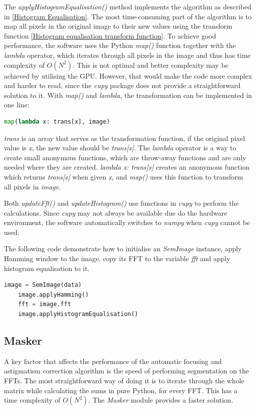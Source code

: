 \documentclass[conference]{IEEEtran}
\begin{document}
The \textit{applyHistogramEqualisation()} method implements the algorithm as described in \ref{Histogram Equalisation}. The most time-consuming part of the algorithm is to map all pixels in the original image to their new values using the transform function \eqref{Histogram equalisation transform function}. To achieve good performance, the software uses the Python \textit{map()} function together with the \textit{lambda} operator, which iterates through all pixels in the image and thus has time complexity of $O(N^2)$. This is not optimal and better complexity may be achieved by utilising the GPU. However, that would make the code more complex and harder to read, since the \textit{cupy} package does not provide a straightforward solution to it. With \textit{map()} and \textit{lambda}, the transformation can be implemented in one line:
\begin{lstlisting}[language=Python]
    map(lambda x: trans[x], image)
\end{lstlisting}
\textit{trans} is an array that serves as the transformation function, if the original pixel value is \textit{x}, the new value should be \textit{trans[x]}. The \textit{lambda} operator is a way to create small anonymous functions, which are throw-away functions and are only needed where they are created. \textit{lambda x: trans[x]} creates an anonymous function which returns \textit{trans[x]} when given \textit{x}, and \textit{map()} uses this function to transform all pixels in \textit{image}.

Both \textit{updateFft()} and \textit{updateHistogram()} use functions in \textit{cupy} to perform the calculations. Since \textit{cupy} may not always be available due do the hardware environment, the software automatically switches to \textit{numpy} when \textit{cupy} cannot be used.

The following code demonstrate how to initialise an \textit{SemImage} instance, apply Hamming window to the image, copy its FFT to the variable \textit{fft} and apply histogram equalisation to it.
\begin{lstlisting}[language=Python]
    image = SemImage(data)
    image.applyHamming()
    fft = image.fft
    image.applyHistogramEqualisation()
\end{lstlisting}

\subsection{Masker}
A key factor that affects the performance of the automatic focusing and astigmatism correction algorithm is the speed of performing segmentation on the FFTs. The most straightforward way of doing it is to iterate through the whole matrix while calculating the sums in pure Python, for every FFT. This has a time complexity of $O(N^2)$. The \textit{Masker} module provides a faster solution.
\end{document}
